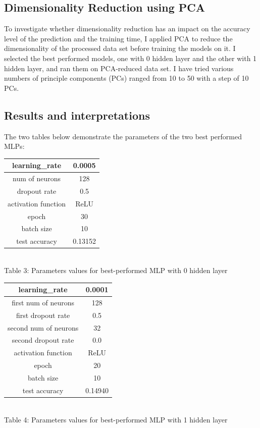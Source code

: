 \documentclass[letterpaper, 12 pt, conference]{ieeeconf}  %
\begin{document}
\subsection{Dimensionality Reduction using PCA}
To investigate whether dimensionality reduction has an impact on the accuracy level of the prediction and the training time, I applied PCA to reduce the dimensionality of the processed data set before training the models on it. I selected the best performed models, one with 0 hidden layer and the other with 1 hidden layer, and ran them on PCA-reduced data set. I have tried various numbers of principle components (PCs) ranged from 10 to 50 with a step of 10 PCs. 
\subsection{Results and interpretations}
The two tables below demonstrate the parameters of the two best performed MLPs:\\
\begin{center}
 \begin{tabular}{||c| c||} 
 \hline
 learning\_rate &  0.0005\\
 \hline
 num of neurons & 128 \\
 \hline
 dropout rate & 0.5\\
 \hline
 activation function & ReLU\\ 
   \hline
epoch & 30\\ 
 \hline
 batch size & 10\\ 
 \hline
 test accuracy & 0.13152\\
 \hline
\end{tabular}\\
Table 3: Parameters values for best-performed MLP with  0 hidden layer
\end{center}
\begin{center}
 \begin{tabular}{||c| c||} 
 \hline
 learning\_rate &  0.0001\\
 \hline
 first num of neurons & 128 \\
 \hline
  first dropout rate & 0.5\\
 \hline
 second num of neurons & 32 \\
 \hline
 second dropout rate & 0.0\\
 \hline
 activation function & ReLU\\ 
  \hline
epoch & 20\\ 
 \hline
 batch size & 10\\ 
 \hline
 test accuracy & 0.14940\\
 \hline
\end{tabular}\\
Table 4: Parameters values for best-performed MLP with  1 hidden layer
\end{center}
\end{document}
